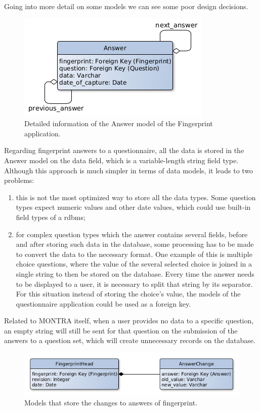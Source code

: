 
Going into more detail on some models we can see some poor design decisions.

\begin{figure}[H]
    \center
    \includegraphics[width=.4\linewidth]{answer-model}
    \caption{Detailed information of the Answer model of the Fingerprint application.}
    \label{fig:answer-model}
\end{figure}

Regarding fingerprint answers to a questionnaire, all the data is stored in the Answer model on the data field, which is a variable-length string field type.
Although this approach is much simpler in terms of data models, it leads to two problems:
\begin{enumerate}
    \item this is not the most optimized way to store all the data types.
        Some question types expect numeric values and other date values, which could use built-in field types of a \gls{rdbms};
    \item for complex question types which the answer contains several fields, before and after storing such data in the database, some processing has to be made to convert the data to the necessary format.
        One example of this is multiple choice questions, where the value of the several selected choice is joined in a single string to then be stored on the database.
        Every time the answer needs to be displayed to a user, it is necessary to split that string by its separator.
        For this situation instead of storing the choice's value, the models of the questionnaire application could be used as a foreign key.
\end{enumerate}

Related to MONTRA itself, when a user provides no data to a specific question, an empty string will still be sent for that question on the submission of the answers to a question set, which will create unnecessary records on the database.

\begin{figure}[H]
    \center
    \includegraphics[width=.6\linewidth]{answer-changes-models}
    \caption{Models that store the changes to answers of fingerprint.}
    \label{fig:answer-changes-models}
\end{figure}

